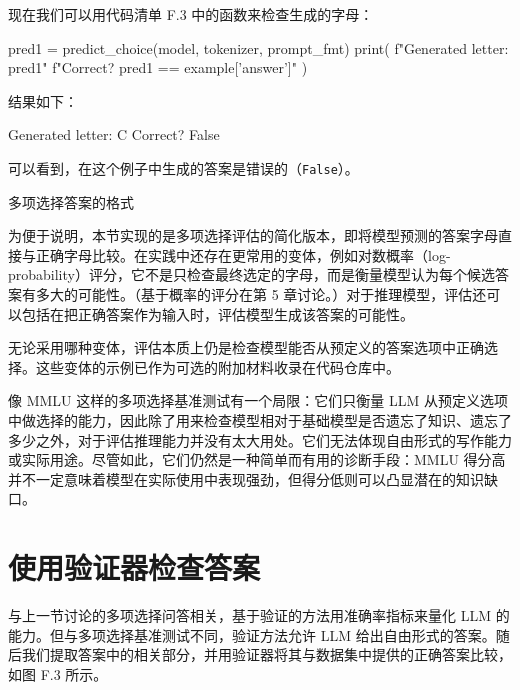 现在我们可以用代码清单 F.3 中的函数来检查生成的字母：

\begin{codebox}
pred1 = predict_choice(model, tokenizer, prompt_fmt)
print(
    f"Generated letter: {pred1}\n"
    f"Correct? {pred1 == example['answer']}"
)
\end{codebox}

结果如下：

\begin{codebox}
Generated letter: C
Correct? False
\end{codebox}

可以看到，在这个例子中生成的答案是错误的（\texttt{False}）。

\begin{mySidebar}{多项选择答案的格式}

为便于说明，本节实现的是多项选择评估的简化版本，即将模型预测的答案字母直接与正确字母比较。在实践中还存在更常用的变体，例如对数概率（log-probability）评分，它不是只检查最终选定的字母，而是衡量模型认为每个候选答案有多大的可能性。（基于概率的评分在第 5 章讨论。）对于推理模型，评估还可以包括在把正确答案作为输入时，评估模型生成该答案的可能性。

无论采用哪种变体，评估本质上仍是检查模型能否从预定义的答案选项中正确选择。这些变体的示例已作为可选的附加材料收录在代码仓库中。

\end{mySidebar}

像 MMLU 这样的多项选择基准测试有一个局限：它们只衡量 LLM 从预定义选项中做选择的能力，因此除了用来检查模型相对于基础模型是否遗忘了知识、遗忘了多少之外，对于评估推理能力并没有太大用处。它们无法体现自由形式的写作能力或实际用途。尽管如此，它们仍然是一种简单而有用的诊断手段：MMLU 得分高并不一定意味着模型在实际使用中表现强劲，但得分低则可以凸显潜在的知识缺口。

\section{使用验证器检查答案}

与上一节讨论的多项选择问答相关，基于验证的方法用准确率指标来量化 LLM 的能力。但与多项选择基准测试不同，验证方法允许 LLM 给出自由形式的答案。随后我们提取答案中的相关部分，并用验证器将其与数据集中提供的正确答案比较，如图 F.3 所示。


